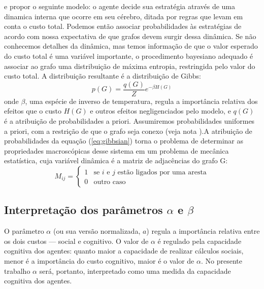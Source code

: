  e propor o seguinte modelo: o agente decide sua estratégia através de uma dinamica interna que ocorre em seu cérebro, ditada por regras que levam em conta o custo total. Podemos então associar probabilidades às estratégias de acordo com nossa expectativa de que grafos devem surgir dessa dinâmica. Se não conhecemos detalhes da dinâmica, mas temos informação de que o valor esperado do custo total é uma variável importante, o procedimento bayesiano adequado é associar ao grafo uma distribuição de máxima entropia, restringida pelo valor do custo total. A distribuição resultante é a distribuição de Gibbs:
\begin{equation}
   \label{eq:gibbsian}
   p(G) = \frac{q(G)}{Z} e^{-\beta H(G)}
\end{equation}
onde $\beta$, uma espécie de inverso de temperatura, regula a importância relativa dos efeitos que o custo \(H(G)\) e outros efeitos negligenciados pelo modelo, e \(q(G)\) é a atribuição de probabilidades a priori. Assumiremos probabilidades uniformes a priori, com a restrição de que o grafo seja conexo (veja nota \footnotemark[\value{footnote}]).A atribuição de probabilidades da equação (\ref{eq:gibbsian}) torna o problema de determinar as propriedades macroscópicas desse sistema em um problema de mecânica estatística, cuja variável dinâmica é a matriz de adjacências do grafo G:
\begin{equation}
  M_{ij} = \begin{cases}
      1  & \text{se $i$ e $j$ estão ligados por uma aresta} \\
      0  & \text{outro caso}
           \end{cases}
\end{equation}
\subsection{Interpretação dos parâmetros $\alpha$ e $\beta$}

O parâmetro $\alpha$ (ou sua versão normalizada, $a$) regula a importância relativa entre os dois custos --- social e cognitivo. O valor de $\alpha$ é regulado pela capacidade cognitiva dos agentes: quanto maior a capacidade de realizar cálculos sociais, menor é a importância do custo cognitivo, maior é o valor de $\alpha$. No presente trabalho $\alpha$ será, portanto, interpretado como uma medida da capacidade cognitiva dos agentes. 

